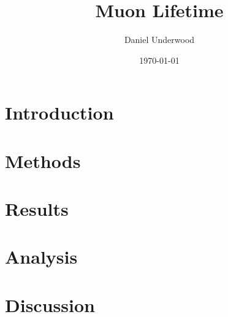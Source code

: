 \documentclass[reprint]{revtex4-1}
\begin{document}
\title{Muon Lifetime}
\author{Daniel Underwood}
\date{\today}


\begin{abstract}
\end{abstract}

\maketitle

\section{Introduction}

\section{Methods}

\section{Results}

\section{Analysis}

\section{Discussion}


\end{document}
